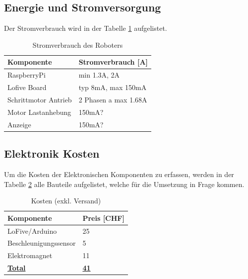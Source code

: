 \documentclass[a4paper]{report}
\begin{document}
\subsection{Energie und Stromversorgung}
\label{app:ssec:EnergieStrom}
Der Stromverbrauch wird in der Tabelle \ref{tab:stromverbrauchstabelle}
aufgelistet.

\noindent
\begin{table}[h!]
	\begin{tabular}{|p{}|p{}|}
		\hline
		\textbf{Komponente} & \textbf{Stromverbrauch [A]} \\
		\hline
		RaspberryPi & min 1.3A, 2A \\
    \hline
    Lofive Board & typ 8mA, max 150mA \\
    \hline
    Schrittmotor Antrieb & 2 Phasen a max 1.68A \\
    \hline
    Motor Lastanhebung & 150mA? \\
    \hline
    Anzeige & 150mA? \\
		\hline
	\end{tabular}
	\caption{Stromverbrauch des Roboters}
	\label{tab:stromverbrauchstabelle}
\end{table}

\subsection{Elektronik Kosten}
\label{app:ssec:ETKosten}
Um die Kosten der Elektronischen Komponenten zu erfassen, werden in der Tabelle
\ref{tab:elektronikkosten} alle Bauteile aufgelistet, welche für die Umsetzung
in Frage kommen. \parencite{Meier2013} \parencite{ReicheltE2017} \parencite{RenoDenver2017}

\noindent
\begin{table}[h!]
	\begin{tabular}{|p{}|p{}|}
		\hline
		\textbf{Komponente} & \textbf{Preis [CHF]} \\
		\hline
		LoFive/Arduino & 25 \\
		\hline
		Beschleunigungssensor & 5 \\
		\hline
		Elektromagnet & 11 \\
		\hline
		\underline{\textbf{Total}} & \underline{\textbf{41}} \\
		\hline
	\end{tabular}
	\caption{Kosten (exkl. Versand)}
	\label{tab:elektronikkosten}
\end{table}
\end{document}
